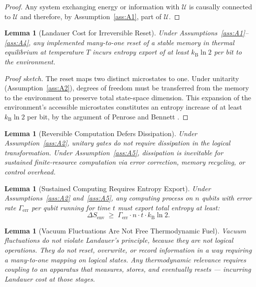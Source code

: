 \documentclass[12pt,letterpaper]{article}
\theoremstyle{plain}
\newtheorem{lemma}[theorem]{Lemma}
\theoremstyle{definition}
\theoremstyle{remark}
\newcommand{\kB}{k_{\mathrm{B}}}
\newcommand{\lnTwo}{\ln 2}
\begin{document}
\begin{proof}
Any system exchanging energy or information with $\mathcal{U}$ is causally connected to
$\mathcal{U}$ and therefore, by Assumption~\ref{ass:A1}, part of $\mathcal{U}$.
\end{proof}

\begin{lemma}[Landauer Cost for Irreversible Reset]\label{lem:L2}
Under Assumptions~\ref{ass:A1}--\ref{ass:A4}, any implemented many-to-one reset of a stable
memory in thermal equilibrium at temperature $T$ incurs entropy export of at least
$\kB\lnTwo$ per bit to the environment.
\end{lemma}

\begin{proof}[Proof sketch]
The reset maps two distinct microstates to one.  Under unitarity (Assumption~\ref{ass:A2}),
degrees of freedom must be transferred from the memory to the environment to preserve total
state-space dimension.  This expansion of the environment's accessible microstates constitutes
an entropy increase of at least $\kB\lnTwo$ per bit, by the argument of Penrose and Bennett
\cite{Bennett2003}.
\end{proof}

\begin{lemma}[Reversible Computation Defers Dissipation]\label{lem:L3}
Under Assumption~\ref{ass:A2}, unitary gates do not require dissipation in the logical
transformation.  Under Assumption~\ref{ass:A5}, dissipation is inevitable for sustained
finite-resource computation via error correction, memory recycling, or control overhead.
\end{lemma}

\begin{lemma}[Sustained Computing Requires Entropy Export]\label{lem:L4}
Under Assumptions~\ref{ass:A2} and~\ref{ass:A5}, any computing process on $n$ qubits with
error rate $\Gamma_{\mathrm{err}}$ per qubit running for time $t$ must export total entropy at
least:
\begin{equation}
  \Delta S_{\mathrm{env}}
  \;\geq\;
  \Gamma_{\mathrm{err}}\cdot n \cdot t \cdot \kB\lnTwo.
  \label{eq:entropy-export}
\end{equation}
\end{lemma}

\begin{lemma}[Vacuum Fluctuations Are Not Free Thermodynamic Fuel]\label{lem:L5}
Vacuum fluctuations do not violate Landauer's principle, because they are not logical
operations.  They do not reset, overwrite, or record information in a way requiring a
many-to-one mapping on logical states.  Any thermodynamic relevance requires coupling to an
apparatus that measures, stores, and eventually resets --- incurring Landauer cost at those
stages.
\end{lemma}
\end{document}
